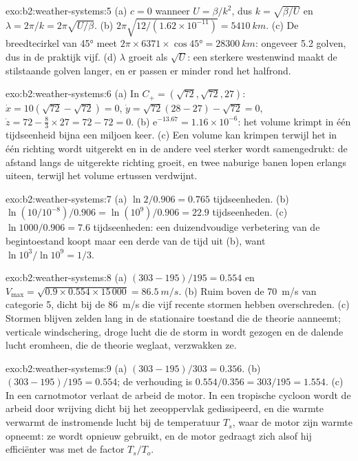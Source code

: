 \begin{solution}{exo:b2:weather-systems:5}
(a) $c = 0$ wanneer $U = \beta/k^2$, dus $k = \sqrt{\beta/U}$ en $\lambda = 2\pi/k =
2\pi\sqrt{U/\beta}$. (b) $2\pi\sqrt{12/(1.62 \times 10^{-11})} = \qty{5410}{km}$. (c) De
breedtecirkel van \ang{45} meet $2\pi \times 6371 \times \cos\ang{45} = \qty{28300}{km}$: ongeveer 5.2
golven, dus in de praktijk vijf. (d) $\lambda$ groeit als $\sqrt U$: een sterkere westenwind maakt de
stilstaande golven langer, en er passen er minder rond het halfrond.
\end{solution}

\begin{solution}{exo:b2:weather-systems:6}
(a) In $C_+ = (\sqrt{72}, \sqrt{72}, 27)$: $\dot x = 10(\sqrt{72} - \sqrt{72}) = 0$, $\dot y =
\sqrt{72}(28 - 27) - \sqrt{72} = 0$, $\dot z = 72 - \tfrac83 \times 27 = 72 - 72 = 0$.
(b) $\mathrm{e}^{-13.67} = 1.16 \times 10^{-6}$: het volume krimpt in één tijdseenheid bijna een miljoen keer.
(c) Een volume kan krimpen terwijl het in één richting wordt uitgerekt en in de andere veel
sterker wordt samengedrukt: de afstand langs de uitgerekte richting groeit, en twee naburige
banen lopen erlangs uiteen, terwijl het volume ertussen verdwijnt.
\end{solution}

\begin{solution}{exo:b2:weather-systems:7}
(a) $\ln 2/0.906 = 0.765$ tijdseenheden. (b) $\ln(10/10^{-8})/0.906 = \ln(10^9)/0.906 = 22.9$
tijdseenheden. (c) $\ln 1000/0.906 = 7.6$ tijdseenheden: een duizendvoudige verbetering van de begintoestand
koopt maar een derde van de tijd uit (b), want $\ln 10^3/\ln 10^9 = 1/3$.
\end{solution}

\begin{solution}{exo:b2:weather-systems:8}
(a) $(303 - 195)/195 = 0.554$ en $V_{\max} = \sqrt{0.9 \times 0.554 \times 15\,000} =
\qty{86.5}{m/s}$. (b) Ruim boven de \qty{70}{m/s} van categorie 5, dicht bij de \qty{86}{m/s} die
vijf recente stormen hebben overschreden. (c) Stormen blijven zelden lang in de stationaire toestand die de theorie
aanneemt; verticale windschering, droge lucht die de storm in wordt gezogen en de dalende lucht eromheen, die
de theorie weglaat, verzwakken ze.
\end{solution}

\begin{solution}{exo:b2:weather-systems:9}
(a) $(303 - 195)/303 = 0.356$. (b) $(303 - 195)/195 = 0.554$; de verhouding is $0.554/0.356 =
303/195 = 1.554$. (c) In een carnotmotor verlaat de arbeid de motor. In een tropische cycloon wordt de
arbeid door wrijving dicht bij het zeeoppervlak gedissipeerd, en die warmte verwarmt de instromende lucht bij de
temperatuur $T_s$, waar de motor zijn warmte opneemt: ze wordt opnieuw gebruikt, en de motor gedraagt zich
alsof hij efficiënter was met de factor $T_s/T_o$.
\end{solution}

